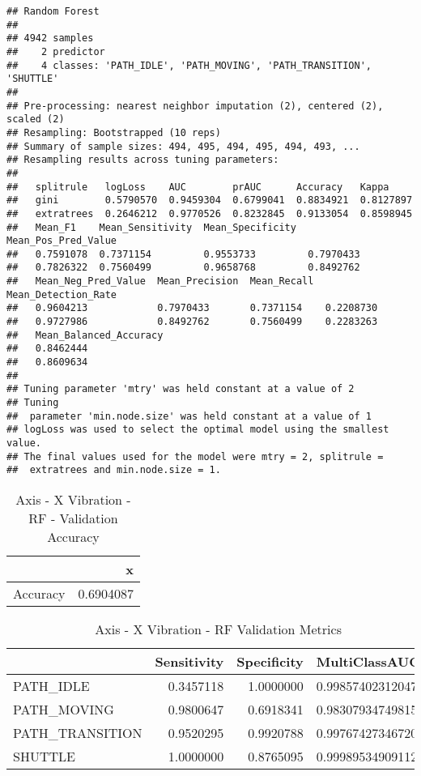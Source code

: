 \documentclass[]{article}
\begin{document}
\begin{verbatim}
## Random Forest 
## 
## 4942 samples
##    2 predictor
##    4 classes: 'PATH_IDLE', 'PATH_MOVING', 'PATH_TRANSITION', 'SHUTTLE' 
## 
## Pre-processing: nearest neighbor imputation (2), centered (2), scaled (2) 
## Resampling: Bootstrapped (10 reps) 
## Summary of sample sizes: 494, 495, 494, 495, 494, 493, ... 
## Resampling results across tuning parameters:
## 
##   splitrule   logLoss    AUC        prAUC      Accuracy   Kappa    
##   gini        0.5790570  0.9459304  0.6799041  0.8834921  0.8127897
##   extratrees  0.2646212  0.9770526  0.8232845  0.9133054  0.8598945
##   Mean_F1    Mean_Sensitivity  Mean_Specificity  Mean_Pos_Pred_Value
##   0.7591078  0.7371154         0.9553733         0.7970433          
##   0.7826322  0.7560499         0.9658768         0.8492762          
##   Mean_Neg_Pred_Value  Mean_Precision  Mean_Recall  Mean_Detection_Rate
##   0.9604213            0.7970433       0.7371154    0.2208730          
##   0.9727986            0.8492762       0.7560499    0.2283263          
##   Mean_Balanced_Accuracy
##   0.8462444             
##   0.8609634             
## 
## Tuning parameter 'mtry' was held constant at a value of 2
## Tuning
##  parameter 'min.node.size' was held constant at a value of 1
## logLoss was used to select the optimal model using the smallest value.
## The final values used for the model were mtry = 2, splitrule =
##  extratrees and min.node.size = 1.
\end{verbatim}

\begin{table}[!h]

\caption{\label{tab:sensor-x-vib-rf-results}Axis - X Vibration - RF - Validation Accuracy}
\centering
\begin{tabular}[t]{lr}
\toprule
  & x\\
\midrule
Accuracy & 0.6904087\\
\bottomrule
\end{tabular}
\end{table}

\begin{table}[!h]

\caption{\label{tab:sensor-x-vib-rf-results}Axis - X Vibration - RF Validation Metrics}
\centering
\begin{tabular}[t]{lrrl}
\toprule
  & Sensitivity & Specificity & MultiClassAUC\\
\midrule
PATH\_IDLE & 0.3457118 & 1.0000000 & 0.998574023120472\\
PATH\_MOVING & 0.9800647 & 0.6918341 & 0.983079347498156\\
PATH\_TRANSITION & 0.9520295 & 0.9920788 & 0.997674273467205\\
SHUTTLE & 1.0000000 & 0.8765095 & 0.999895349091123\\
\bottomrule
\end{tabular}
\end{table}
\end{document}
